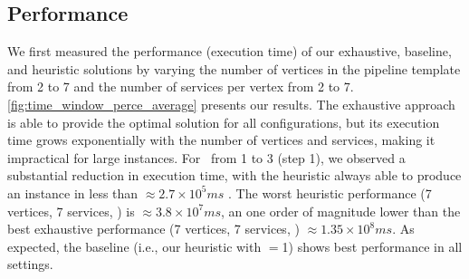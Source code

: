     \subsection{Performance}\label{subsec:experiments_performance}
    We first measured the performance (execution time) of our exhaustive, baseline, and heuristic solutions by varying the number of vertices in the pipeline template from 2 to 7 and the number of services per vertex from 2 to 7. \cref{fig:time_window_perce_average} presents our results.
    The exhaustive approach is able to provide the optimal solution for all configurations, but its execution time grows exponentially with the number of vertices and services, making it impractical for large instances. For \windowsize\ from 1 to 3 (step 1), we observed a substantial reduction in execution time, with the heuristic always able to produce an instance in less than $\approx2.7\times10^5ms$ . The worst heuristic performance (7 vertices, 7 services, ) is $\approx3.8\times10^7ms$, an one order of magnitude lower than the best exhaustive performance (7 vertices, 7 services, ) $\approx1.35\times10^8ms$. {\color{OurColor} As expected, the baseline (i.e., our heuristic with \windowsize$=$1) shows best performance in all settings.}
